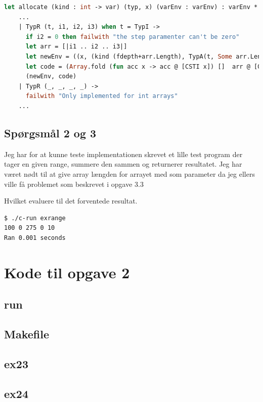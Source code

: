 \documentclass[danish,a4paper]{report}
\begin{document}
\begin{lstlisting}[language=ML]
let allocate (kind : int -> var) (typ, x) (varEnv : varEnv) : varEnv * instr list =
    ...
    | TypR (t, i1, i2, i3) when t = TypI ->
      if i2 = 0 then failwith "the step paramenter can't be zero"
      let arr = [|i1 .. i2 .. i3|]
      let newEnv = ((x, (kind (fdepth+arr.Length), TypA(t, Some arr.Length))) :: env, fdepth+arr.Length+1)
      let code = (Array.fold (fun acc x -> acc @ [CSTI x]) []  arr @ [GETSP; CSTI (arr.Length - 1); SUB])
      (newEnv, code) 
    | TypR (_, _, _, _) ->
      failwith "Only implemented for int arrays"
    ...
\end{lstlisting}

\section*{Spørgsmål 2 og 3}

Jeg har for at kunne teste implementationen skrevet et lille test program der tager en given range, summere den sammen og returnerer resultatet. Jeg har været nødt til at give array længden for arrayet med som parameter da jeg ellers ville få problemet som beskrevet i opgave 3.3



Hvilket evaluere til det forventede resultat.

\begin{lstlisting}[language=bash]
$ ./c-run exrange
100 0 275 0 10
Ran 0.001 seconds
\end{lstlisting}

\appendix
\chapter{Kode til opgave 2}
\section*{run}

\section*{Makefile}

\section*{ex23}

\section*{ex24}

\end{document}
